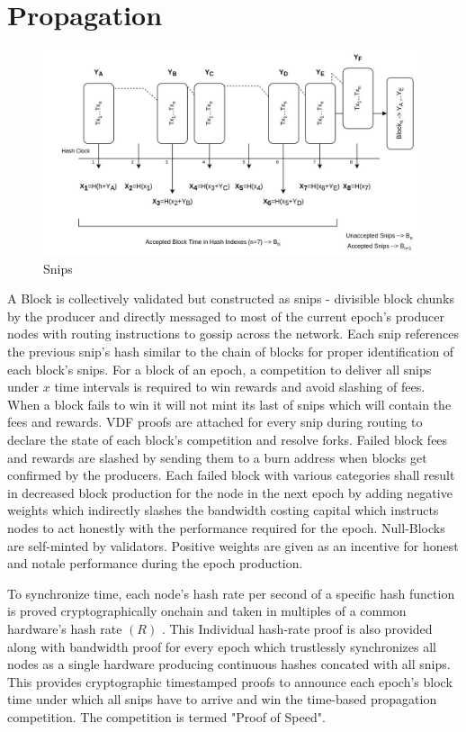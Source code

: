 \documentclass[a4paper,10pt]{article}
\begin{document}
\section{Propagation}
\begin{figure}[H]
\begin{center}
\includegraphics[width=11cm]{Snips}
\caption{Snips}
\end{center}
\end{figure}
A Block is collectively validated but constructed as snips - divisible block chunks by the producer and directly messaged to most of the current epoch's producer nodes with routing instructions to gossip across the network. Each snip references the previous snip's hash similar to the chain of blocks for proper identification of each block's snips. For a block of an epoch, a competition to deliver all snips under $x$ time intervals is required to win rewards and avoid slashing of fees. When a block fails to win it will not mint its last of snips which will contain the fees and rewards. VDF proofs are attached for every snip during routing to declare the state of each block's competition and resolve forks. Failed block fees and rewards are slashed by sending them to a burn address when blocks get confirmed by the producers. Each failed block with various categories shall result in decreased block production for the node in the next epoch by adding negative weights which indirectly slashes the bandwidth costing capital which instructs nodes to act honestly with the performance required for the epoch. Null-Blocks are self-minted by validators. Positive weights are given as an incentive for honest and notale performance during the epoch production. 

To synchronize time, each node's hash rate per second of a specific hash function is proved cryptographically onchain and taken in multiples of a common hardware's hash rate $(R)$ . This Individual hash-rate proof is also provided along with bandwidth proof for every epoch which trustlessly synchronizes all nodes as a single hardware producing continuous hashes concated with all snips. This provides cryptographic timestamped proofs to announce each epoch's block time under which all snips have to arrive and win the time-based propagation competition. The competition is termed "Proof of Speed".
\end{document}
